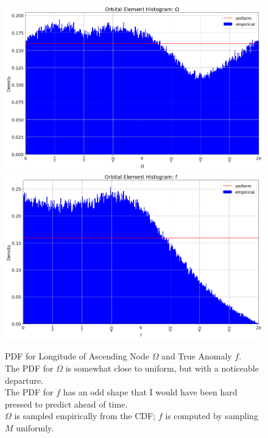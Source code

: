 \begin{figure}[hbt!]
\begin{center}
\includegraphics[width=1.0\textwidth]{../figs/elts/elt_hist_Omega_node.png}
\includegraphics[width=1.0\textwidth]{../figs/elts/elt_hist_f.png}
\end{center}
\caption[PDF for Longitude of Ascending Node $\Omega$ and True Anomaly $f$]
{PDF for Longitude of Ascending Node $\Omega$ and True Anomaly $f$.\\ 
The PDF for $\Omega$ is somewhat close to uniform, but with a noticeable departure.\\
The PDF for $f$ has an odd shape that I would have been hard pressed to predict ahead of time.\\
$\Omega$ is sampled empirically from the CDF; $f$ is computed by sampling $M$ uniformly.}
\label{fig:elt_dist_Omega_f}
\end{figure}
\clearpage

